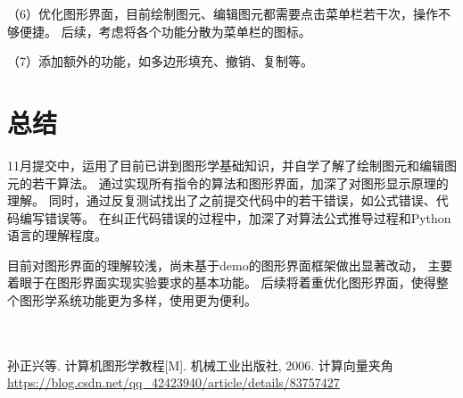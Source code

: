 \documentclass[a4paper,UTF8]{article}
\theoremstyle{definition}
\begin{document}
（6）优化图形界面，目前绘制图元、编辑图元都需要点击菜单栏若干次，操作不够便捷。
后续，考虑将各个功能分散为菜单栏的图标。

（7）添加额外的功能，如多边形填充、撤销、复制等。


\section{总结}
11月提交中，运用了目前已讲到图形学基础知识，并自学了解了绘制图元和编辑图元的若干算法。
通过实现所有指令的算法和图形界面，加深了对图形显示原理的理解。
同时，通过反复测试找出了之前提交代码中的若干错误，如公式错误、代码编写错误等。
在纠正代码错误的过程中，加深了对算法公式推导过程和Python语言的理解程度。

目前对图形界面的理解较浅，尚未基于demo的图形界面框架做出显著改动，
主要着眼于在图形界面实现实验要求的基本功能。
后续将着重优化图形界面，使得整个图形学系统功能更为多样，使用更为便利。
\\\\\\


\begin{thebibliography}{99}
 孙正兴等. 计算机图形学教程[M]. 机械工业出版社, 2006.
 计算向量夹角\\\url{https://blog.csdn.net/qq_42423940/article/details/83757427}
\end{thebibliography}
\end{document}

